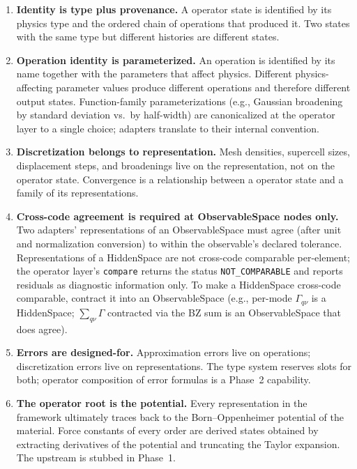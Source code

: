 \documentclass[11pt,a4paper]{article}
\begin{document}
\begin{enumerate}[leftmargin=2.5em, itemsep=0.4em]
  \item \textbf{Identity is type plus provenance.} A operator state is identified by its
        physics type and the ordered chain of operations that produced it. Two states
        with the same type but different histories are different states.

  \item \textbf{Operation identity is parameterized.} An operation is identified by its
        name together with the parameters that affect physics. Different physics-affecting
        parameter values produce different operations and therefore different output
        states. Function-family parameterizations (e.g., Gaussian broadening by standard
        deviation vs.\ by half-width) are canonicalized at the operator layer to a single
        choice; adapters translate to their internal convention.

  \item \textbf{Discretization belongs to representation.} Mesh densities, supercell
        sizes, displacement steps, and broadenings live on the representation, not on
        the operator state. Convergence is a relationship between a operator state and
        a family of its representations.

  \item \textbf{Cross-code agreement is required at ObservableSpace nodes only.} Two
        adapters' representations of an ObservableSpace must agree (after unit and
        normalization conversion) to within the observable's declared tolerance.
        Representations of a HiddenSpace are not cross-code comparable per-element;
        the operator layer's \texttt{compare} returns the status \texttt{NOT\_COMPARABLE}
        and reports residuals as diagnostic information only. To make a HiddenSpace
        cross-code comparable, contract it into an ObservableSpace (e.g., per-mode
        $\Gamma_{q\nu}$ is a HiddenSpace; $\sum_{q\nu}\Gamma$ contracted via the
        BZ sum is an ObservableSpace that does agree).

  \item \textbf{Errors are designed-for.} Approximation errors live on operations;
        discretization errors live on representations. The type system reserves slots
        for both; operator composition of error formulas is a Phase~2 capability.

  \item \textbf{The operator root is the potential.} Every representation in the framework
        ultimately traces back to the Born--Oppenheimer potential of the material. Force
        constants of every order are derived states obtained by extracting derivatives of
        the potential and truncating the Taylor expansion. The upstream is stubbed in
        Phase~1.


\end{enumerate}
\end{document}
